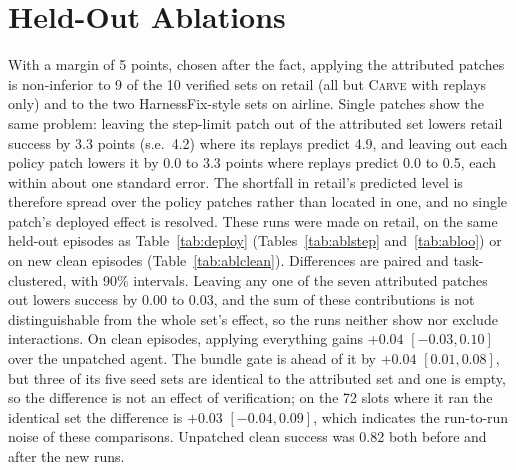 \documentclass[11pt]{article}
\newcommand{\carve}{\textsc{Carve}}
\begin{document}
\section{Held-Out Ablations}
\label{app:ablate}
With a margin of 5 points, chosen after the fact, applying the attributed patches is non-inferior to 9 of the 10 verified sets on retail (all but \carve{} with replays only) and to the two HarnessFix-style sets on airline. Single patches show the same problem: leaving the step-limit patch out of the attributed set lowers retail success by 3.3 points (s.e.\ 4.2) where its replays predict 4.9, and leaving out each policy patch lowers it by 0.0 to 3.3 points where replays predict 0.0 to 0.5, each within about one standard error. The shortfall in retail's predicted level is therefore spread over the policy patches rather than located in one, and no single patch's deployed effect is resolved. These runs were made on retail, on the same held-out episodes as Table~\ref{tab:deploy} (Tables~\ref{tab:ablstep} and~\ref{tab:abloo}) or on new clean episodes (Table~\ref{tab:ablclean}). Differences are paired and task-clustered, with 90\% intervals. Leaving any one of the seven attributed patches out lowers success by 0.00 to 0.03, and the sum of these contributions is not distinguishable from the whole set's effect, so the runs neither show nor exclude interactions. On clean episodes, applying everything gains $+0.04$ $[-0.03,0.10]$ over the unpatched agent. The bundle gate is ahead of it by $+0.04$ $[0.01,0.08]$, but three of its five seed sets are identical to the attributed set and one is empty, so the difference is not an effect of verification; on the 72 slots where it ran the identical set the difference is $+0.03$ $[-0.04,0.09]$, which indicates the run-to-run noise of these comparisons. Unpatched clean success was 0.82 both before and after the new runs.

\begin{table}[h]
\centering
\small
{}
\caption{Removing the step-limit patch from each policy's seed-0 set (the bundle gate's seed-0 set equals the attributed set). 108 episodes without and 12 with the step-limit fault.}
\label{tab:ablstep}
\end{table}
\end{document}
